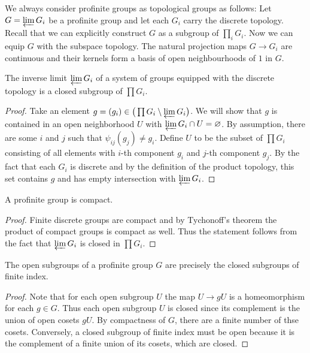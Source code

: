 \begin{remark}
	We always consider profinite groups as topological groups as follows: Let $G = \varprojlim G_i$ be a profinite group and let each $G_i$ carry the discrete topology. Recall that we can explicitly construct $G$ as a subgroup of $\prod_i G_i$. Now we can equip $G$ with the subspace topology. The natural projection maps $G \to G_i$ are continuous and their kernels form a basis of open neighbourhoods of $1$ in $G$.
\end{remark}

\begin{lemma}
	The inverse limit $\varprojlim G_i$ of a system of groups equipped with the discrete topology is a closed subgroup of $\prod G_i$.
\end{lemma}

\begin{proof}
	Take an element $g = (g_i) \in \big(\prod G_i \setminus \varprojlim G_i \big)$. We will show that $g$ is contained in an open neighborhood $U$ with $\varprojlim G_i \cap U  = \varnothing$. By assumption, there are some $i$ and $j$ such that $\psi_{ij}(g_j) \neq g_i$. Define $U$ to be the subset of $\prod G_i$ consisting of all elements with $i$-th component $g_i$ and $j$-th component $g_j$. By the fact that each $G_i$ is discrete and by the definition of the product topology, this set contains $g$ and has empty intersection with $\varprojlim G_i$.
\end{proof}

\begin{corollary}
	A profinite group is compact.
\end{corollary}

\begin{proof}
	Finite discrete groups are compact and by Tychonoff's theorem the product of compact groups is compact as well. Thus the statement follows from the fact that $\varprojlim G_i$ is closed in $\prod G_i$.
\end{proof}

\begin{corollary}
	The open subgroups of a profinite group $G$ are precisely the closed subgroups of finite index.
\end{corollary}

\begin{proof}
	Note that for each open subgroup $U$ the map $U \to gU$ is a homeomorphism for each $g \in G$. Thus each open subgroup $U$ is closed since its complement is the union of open cosets $gU$. By compactness of $G$, there are a finite number of thse cosets. Conversely, a closed subgroup of finite index must be open because it is the complement of a finite union of its cosets, which are closed.
\end{proof}

